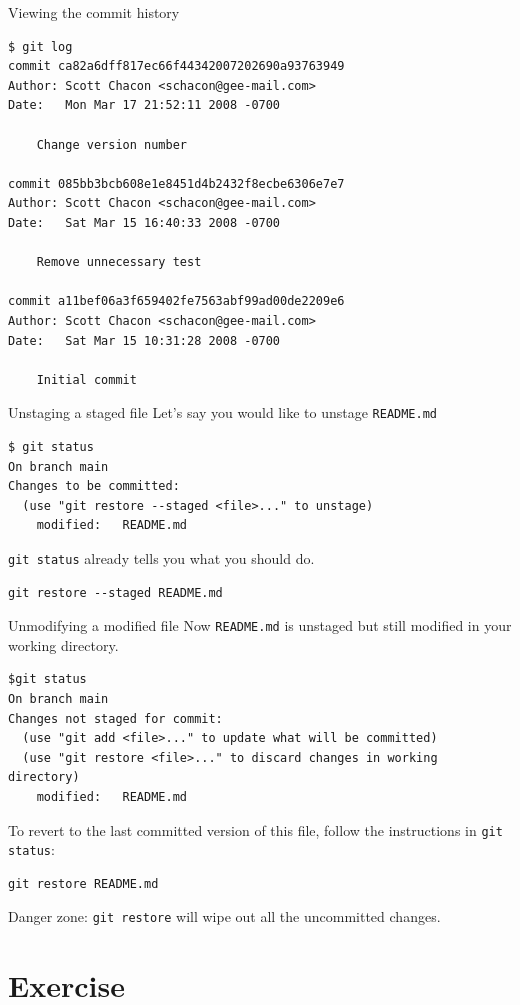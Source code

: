 \documentclass[handout]{beamer}
\begin{document}
\begin{frame}[fragile]{Viewing the commit history}
\begin{lstlisting}
$ git log
commit ca82a6dff817ec66f44342007202690a93763949
Author: Scott Chacon <schacon@gee-mail.com>
Date:   Mon Mar 17 21:52:11 2008 -0700

    Change version number

commit 085bb3bcb608e1e8451d4b2432f8ecbe6306e7e7
Author: Scott Chacon <schacon@gee-mail.com>
Date:   Sat Mar 15 16:40:33 2008 -0700

    Remove unnecessary test
    
commit a11bef06a3f659402fe7563abf99ad00de2209e6
Author: Scott Chacon <schacon@gee-mail.com>
Date:   Sat Mar 15 10:31:28 2008 -0700

    Initial commit
\end{lstlisting}
\end{frame}

\begin{frame}[fragile]{Unstaging a staged file}
Let's say you would like to unstage \texttt{README.md}
\begin{lstlisting}
$ git status
On branch main
Changes to be committed:
  (use "git restore --staged <file>..." to unstage)
	modified:   README.md
\end{lstlisting}
\texttt{git status} already tells you what you should do.
\begin{lstlisting}
git restore --staged README.md
\end{lstlisting}
\end{frame}

\begin{frame}[fragile]{Unmodifying a modified file}
Now \texttt{README.md} is unstaged but still modified in your working directory. 
\begin{lstlisting}
$git status
On branch main
Changes not staged for commit:
  (use "git add <file>..." to update what will be committed)
  (use "git restore <file>..." to discard changes in working directory)
	modified:   README.md
\end{lstlisting}
To revert to the last committed version of this file, follow the instructions in \texttt{git status}:
\begin{lstlisting}
git restore README.md
\end{lstlisting}
\alert{Danger zone}: \texttt{git restore} will wipe out all the uncommitted changes.
\end{frame}

\section{Exercise}
\end{document}
